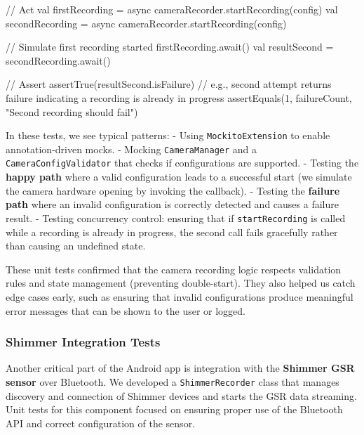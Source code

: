 \documentclass[11pt,a4paper]{report}
\begin{document}
{{            // Act
            val firstRecording = async { cameraRecorder.startRecording(config) }
            val secondRecording = async { cameraRecorder.startRecording(config) }

            // Simulate first recording started
            firstRecording.await()
            val resultSecond = secondRecording.await()

            // Assert
            assertTrue(resultSecond.isFailure) 
            // e.g., second attempt returns failure indicating a recording is already in progress
            assertEquals(1, failureCount, "Second recording should fail")
        }
    }

In these tests, we see typical patterns: - Using \texttt{MockitoExtension} to
enable annotation-driven mocks. - Mocking \texttt{CameraManager} and a
\texttt{CameraConfigValidator} that checks if configurations are supported. -
Testing the \textbf{happy path} where a valid configuration leads to a
successful start (we simulate the camera hardware opening by invoking
the callback). - Testing the \textbf{failure path} where an invalid
configuration is correctly detected and causes a failure result. -
Testing concurrency control: ensuring that if \texttt{startRecording} is called
while a recording is already in progress, the second call fails
gracefully rather than causing an undefined state.

These unit tests confirmed that the camera recording logic respects
validation rules and state management (preventing double-start). They
also helped us catch edge cases early, such as ensuring that invalid
configurations produce meaningful error messages that can be shown to
the user or logged.

\subsubsection{Shimmer Integration Tests}

Another critical part of the Android app is integration with the
\textbf{Shimmer GSR sensor} over Bluetooth. We developed a \texttt{ShimmerRecorder}
class that manages discovery and connection of Shimmer devices and
starts the GSR data streaming. Unit tests for this component focused on
ensuring proper use of the Bluetooth API and correct configuration of
the sensor.
\end{document}
